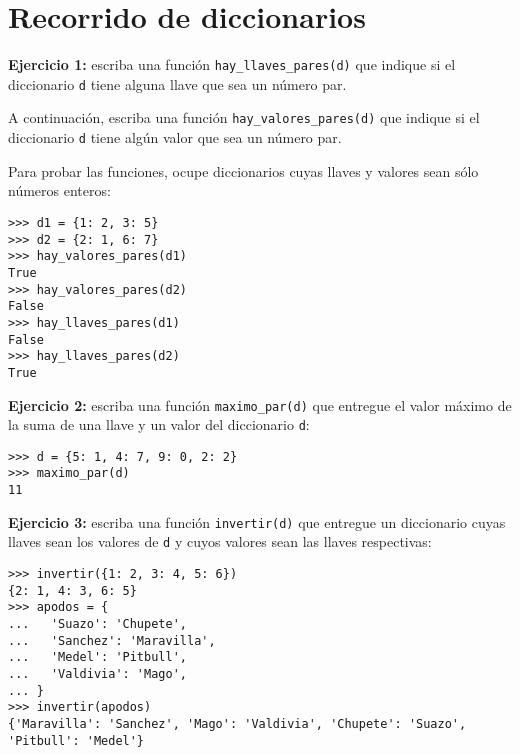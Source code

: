 \section{Recorrido de diccionarios}

\textbf{Ejercicio 1:} escriba una función
\lstinline!hay_llaves_pares(d)! que indique si el diccionario
\lstinline!d! tiene alguna llave que sea un número par.

A continuación, escriba una función \lstinline!hay_valores_pares(d)! que
indique si el diccionario \lstinline!d! tiene algún valor que sea un
número par.

Para probar las funciones, ocupe diccionarios cuyas llaves y valores
sean sólo números enteros:

\begin{lstlisting}
>>> d1 = {1: 2, 3: 5}
>>> d2 = {2: 1, 6: 7}
>>> hay_valores_pares(d1)
True
>>> hay_valores_pares(d2)
False
>>> hay_llaves_pares(d1)
False
>>> hay_llaves_pares(d2)
True
\end{lstlisting}

\textbf{Ejercicio 2:} escriba una función \lstinline!maximo_par(d)! que
entregue el valor máximo de la suma de una llave y un valor del
diccionario \lstinline!d!:

\begin{lstlisting}
>>> d = {5: 1, 4: 7, 9: 0, 2: 2}
>>> maximo_par(d)
11
\end{lstlisting}

\textbf{Ejercicio 3:} escriba una función \lstinline!invertir(d)! que
entregue un diccionario cuyas llaves sean los valores de \lstinline!d! y
cuyos valores sean las llaves respectivas:

\begin{lstlisting}
>>> invertir({1: 2, 3: 4, 5: 6})
{2: 1, 4: 3, 6: 5}
>>> apodos = {
...   'Suazo': 'Chupete',
...   'Sanchez': 'Maravilla',
...   'Medel': 'Pitbull',
...   'Valdivia': 'Mago',
... }
>>> invertir(apodos)
{'Maravilla': 'Sanchez', 'Mago': 'Valdivia', 'Chupete': 'Suazo', 'Pitbull': 'Medel'}
\end{lstlisting}

